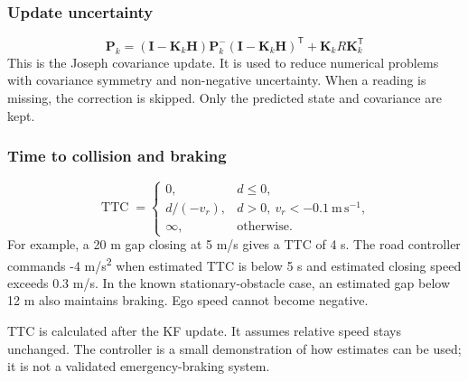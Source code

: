 \documentclass[11pt,a4paper]{article}
\begin{document}
\subsubsection{Update uncertainty}
\begin{equation}\mathbf{P}_k=(\mathbf{I}-\mathbf{K}_k\mathbf{H})\mathbf{P}_k^-(\mathbf{I}-\mathbf{K}_k\mathbf{H})^{\mathsf T}+\mathbf{K}_kR\mathbf{K}_k^{\mathsf T}\end{equation}
This is the Joseph covariance update. It is used to reduce numerical problems with covariance symmetry and non-negative uncertainty. When a reading is missing, the correction is skipped. Only the predicted state and covariance are kept.\par

\subsubsection{Time to collision and braking}
\begin{equation}\operatorname{TTC}=\begin{cases}0,&d\leq0,\\d/(-v_r),&d>0,\ v_r<-0.1\ \mathrm{m\,s^{-1}},\\\infty,&\text{otherwise}.\end{cases}\end{equation}
For example, a 20 m gap closing at 5 m/s gives a TTC of 4 s. The road controller commands -4 m/s\textsuperscript{2} when estimated TTC is below 5 s and estimated closing speed exceeds 0.3 m/s. In the known stationary-obstacle case, an estimated gap below 12 m also maintains braking. Ego speed cannot become negative.\par

TTC is calculated after the KF update. It assumes relative speed stays unchanged. The controller is a small demonstration of how estimates can be used; it is not a validated emergency-braking system.\par
\end{document}
